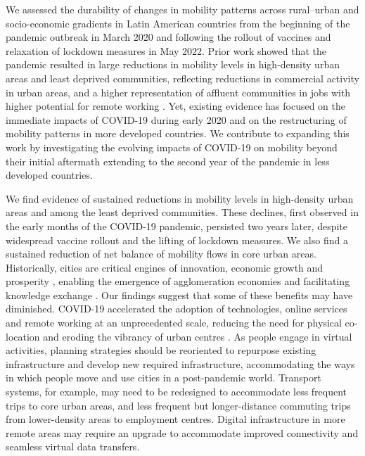 \documentclass[fleqn,10pt]{wlscirep}
\begin{document}
We assessed the durability of changes in mobility patterns across rural–urban and socio-economic gradients in Latin American countries from the beginning of the pandemic outbreak in March 2020 and following the rollout of vaccines and relaxation of lockdown measures in May 2022. Prior work showed that the pandemic resulted in large reductions in mobility levels in high-density urban areas and least deprived communities, reflecting reductions in commercial activity in urban areas, and a higher representation of affluent communities in jobs with higher potential for remote working \cite{bartik2020jobs, Zhou26}. Yet, existing evidence has focused on the immediate impacts of COVID-19 during early 2020 and on the restructuring of mobility patterns in more developed countries. We contribute to expanding this work by investigating the evolving impacts of COVID-19 on mobility beyond their initial aftermath extending to the second year of the pandemic in less developed countries.

We find evidence of sustained reductions in mobility levels in high-density urban areas and among the least deprived communities. These declines, first observed in the early months of the COVID-19 pandemic, persisted two years later, despite widespread vaccine rollout and the lifting of lockdown measures. We also find a sustained reduction of net balance of mobility flows in core urban areas. Historically, cities are critical engines of innovation, economic growth and prosperity \cite{Glaeser10}, enabling the emergence of agglomeration economies and facilitating knowledge exchange \cite{storper2004}. Our findings suggest that some of these benefits may have diminished. COVID-19 accelerated the adoption of technologies, online services and remote working at an unprecedented scale, reducing the need for physical co-location and eroding the vibrancy of urban centres \cite{Alexander21}. As people engage in virtual activities, planning strategies should be reoriented to repurpose existing infrastructure and develop new required infrastructure, accommodating the ways in which people move and use cities in a post-pandemic world. Transport systems, for example, may need to be redesigned to accommodate less frequent trips to core urban areas, and less frequent but longer-distance commuting trips from lower-density areas to employment centres. Digital infrastructure in more remote areas may require an upgrade to accommodate improved connectivity and seamless virtual data transfers.
\end{document}
